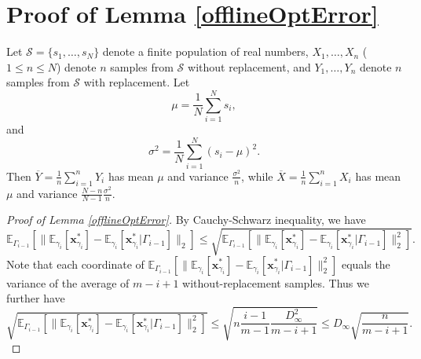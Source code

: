 \documentclass{article}
\begin{document}



\appendix
\section{Proof of Lemma \ref{offlineOptError}}
Let $\mathcal{S}=\{s_1,\ldots,s_N\}$ denote a finite population of real numbers, $X_1,\ldots,X_n$ ($1\le n\le N$) denote $n$ samples from $\mathcal{S}$ without replacement, and $Y_1,\ldots,Y_n$ denote $n$ samples from $\mathcal{S}$ with replacement. Let
\begin{equation}
    \mu=\frac{1}{N}\sum_{i=1}^{N}s_i,
\end{equation}
and
\begin{equation}
    \sigma^2=\frac{1}{N}\sum_{i=1}^{N}(s_i-\mu)^2.
\end{equation}
Then $\overline{Y}=\frac{1}{n}\sum_{i=1}^{n}Y_i$ has mean $\mu$ and variance $\frac{\sigma^2}{n}$, while $\overline{X}=\frac{1}{n}\sum_{i=1}^{n}X_i$ has mean $\mu$ and variance $\frac{N-n}{N-1}\frac{\sigma^2}{n}$.
\begin{proof}[Proof of Lemma \ref{offlineOptError}]
    By Cauchy-Schwarz inequality, we have
    \begin{equation}
        \mathbb{E}_{\Gamma_{i-1}}\left[\|\mathbb{E}_{\gamma_i}[\mathbf{x}_{\gamma_i}^*]-\mathbb{E}_{\gamma_i}[\mathbf{x}_{\gamma_i}^*|\Gamma_{i-1}]\|_2\right]\le\sqrt{\mathbb{E}_{\Gamma_{i-1}}\left[\|\mathbb{E}_{\gamma_i}[\mathbf{x}_{\gamma_i}^*]-\mathbb{E}_{\gamma_i}[\mathbf{x}_{\gamma_i}^*|\Gamma_{i-1}]\|_2^2\right]}.
    \end{equation}
    Note that each coordinate of $\mathbb{E}_{\Gamma_{i-1}}\left[\|\mathbb{E}_{\gamma_i}[\mathbf{x}_{\gamma_i}^*]-\mathbb{E}_{\gamma_i}[\mathbf{x}_{\gamma_i}^*|\Gamma_{i-1}]\|_2^2\right]$ equals the variance of the average of $m-i+1$ without-replacement samples. Thus we further have
    \begin{equation}
        \sqrt{\mathbb{E}_{\Gamma_{i-1}}\left[\|\mathbb{E}_{\gamma_i}[\mathbf{x}_{\gamma_i}^*]-\mathbb{E}_{\gamma_i}[\mathbf{x}_{\gamma_i}^*|\Gamma_{i-1}]\|_2^2\right]}\le\sqrt{n \frac{i-1}{m-1}\frac{D_{\infty}^2}{m-i+1}}\le D_{\infty}\sqrt{\frac{n}{m-i+1}}.
    \end{equation}
\end{proof}
\end{document}
